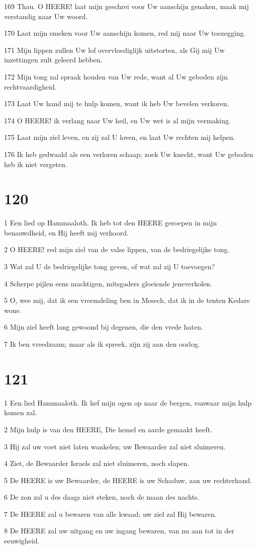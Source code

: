 \par 169 Thau. O HEERE! laat mijn geschrei voor Uw aanschijn genaken, maak mij verstandig naar Uw woord.
\par 170 Laat mijn smeken voor Uw aanschijn komen, red mij naar Uw toezegging.
\par 171 Mijn lippen zullen Uw lof overvloediglijk uitstorten, als Gij mij Uw inzettingen zult geleerd hebben.
\par 172 Mijn tong zal spraak houden van Uw rede, want al Uw geboden zijn rechtvaardigheid.
\par 173 Laat Uw hand mij te hulp komen, want ik heb Uw bevelen verkoren.
\par 174 O HEERE! ik verlang naar Uw heil, en Uw wet is al mijn vermaking.
\par 175 Laat mijn ziel leven, en zij zal U loven, en laat Uw rechten mij helpen.
\par 176 Ik heb gedwaald als een verloren schaap; zoek Uw knecht, want Uw geboden heb ik niet vergeten.

\chapter{120}

\par 1 Een lied op Hammaaloth. Ik heb tot den HEERE geroepen in mijn benauwdheid, en Hij heeft mij verhoord.
\par 2 O HEERE! red mijn ziel van de valse lippen, van de bedriegelijke tong.
\par 3 Wat zal U de bedriegelijke tong geven, of wat zal zij U toevoegen?
\par 4 Scherpe pijlen eens machtigen, mitsgaders gloeiende jeneverkolen.
\par 5 O, wee mij, dat ik een vreemdeling ben in Mesech, dat ik in de tenten Kedars wone.
\par 6 Mijn ziel heeft lang gewoond bij degenen, die den vrede haten.
\par 7 Ik ben vreedzaam; maar als ik spreek, zijn zij aan den oorlog.

\chapter{121}

\par 1 Een lied Hammaaloth. Ik hef mijn ogen op naar de bergen, vanwaar mijn hulp komen zal.
\par 2 Mijn hulp is van den HEERE, Die hemel en aarde gemaakt heeft.
\par 3 Hij zal uw voet niet laten wankelen; uw Bewaarder zal niet sluimeren.
\par 4 Ziet, de Bewaarder Israels zal niet sluimeren, noch slapen.
\par 5 De HEERE is uw Bewaarder, de HEERE is uw Schaduw, aan uw rechterhand.
\par 6 De zon zal u des daags niet steken, noch de maan des nachts.
\par 7 De HEERE zal u bewaren van alle kwaad; uw ziel zal Hij bewaren.
\par 8 De HEERE zal uw uitgang en uw ingang bewaren, van nu aan tot in der eeuwigheid.

